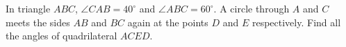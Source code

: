 In triangle $ABC$, $\angle CAB=40^\circ$ and $\angle ABC=60^\circ$. A circle through $A$ and $C$ meets the sides $AB$ and $BC$ again at the points $D$ and $E$ respectively. Find all the angles of quadrilateral $ACED$.
